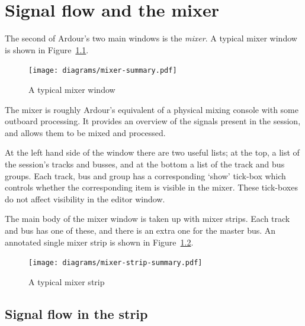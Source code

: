 \documentclass[10pt,a4paper]{book}
\begin{document}
{%

\chapter{Signal flow and the mixer}


The second of Ardour's two main windows is the \emph{mixer}.  A
typical mixer window is shown in Figure~\ref{fig:mixer-summary}.

\begin{figure}[ht]
\begin{center}
\texttt{[image: diagrams/mixer-summary.pdf]}
\end{center}
\caption{A typical mixer window}
\label{fig:mixer-summary}
\end{figure}

The mixer is roughly Ardour's equivalent of a physical mixing console
with some outboard processing.  It provides an overview of the signals
present in the session, and allows them to be mixed and processed.

At the left hand side of the window there are two useful lists; at the
top, a list of the session's tracks and busses, and at the bottom a
list of the track and bus groups.  Each track, bus and group has a
corresponding `show' tick-box which controls whether the corresponding
item is visible in the mixer.  These tick-boxes do not affect
visibility in the editor window.

The main body of the mixer window is taken up with mixer strips.  Each
track and bus has one of these, and there is an extra one for the
master bus.  An annotated single mixer strip is shown in
Figure~\ref{fig:mixer-strip-summary}.

\begin{figure}[ht]
\begin{center}
\texttt{[image: diagrams/mixer-strip-summary.pdf]}
\end{center}
\caption{A typical mixer strip}
\label{fig:mixer-strip-summary}
\end{figure}

\section{Signal flow in the strip}

}
\end{document}
